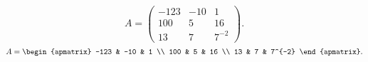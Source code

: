 \documentclass[11pt,a4paper]{article}
\begin{document}
\[
	A =
	\begin{pmatrix}
	-123 & -10 & 1 \\
	100 & 5 & 16 \\
	13 & 7 & 7^{-2}
	\end{pmatrix}.
\]
\[
	A =
	\begin{apmatrix}
	-123 & -10 & 1 \\
	100 & 5 & 16 \\
	13 & 7 & 7^{-2}
	\end{apmatrix}.
\]
\end{document}
